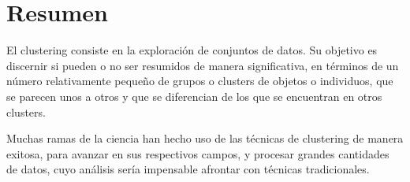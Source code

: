 \section{Resumen}

El clustering consiste en la exploración de conjuntos de datos. Su objetivo es discernir si pueden o no ser resumidos de manera significativa, en términos de un número relativamente pequeño de grupos o clusters de objetos o individuos, que se parecen unos a otros y que se diferencian de los que se encuentran en otros clusters.

Muchas ramas de la ciencia han hecho uso de las técnicas de clustering de manera exitosa, para avanzar en sus respectivos campos, y procesar grandes cantidades de datos, cuyo análisis sería impensable afrontar con técnicas tradicionales.





















